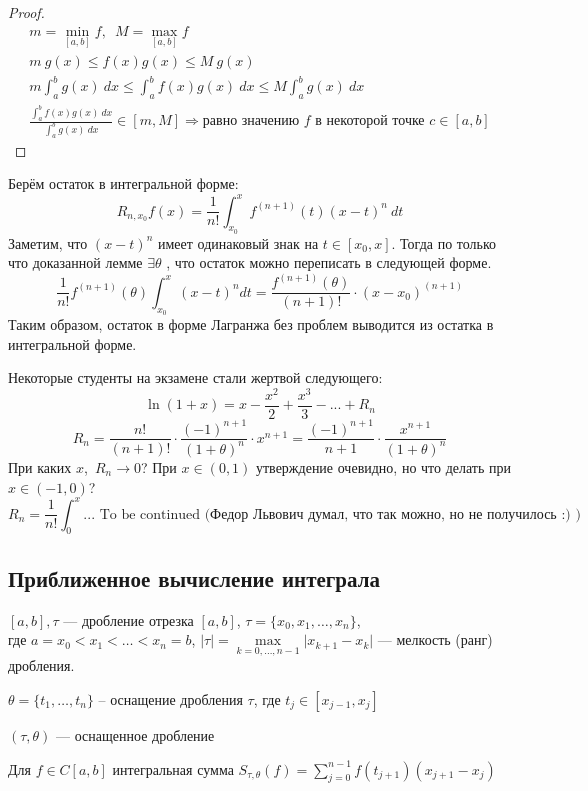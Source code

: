 \newpage 
\begin{proof}
    \[
        \begin{gathered}
            m = \min_{[a, b]} f, \,\,\, M = \max_{[a, b]} f\\
            m\ g(x) \leqslant f(x) g(x) \leqslant M\ g(x)\\
            m \int_a^b g(x)\ dx \leqslant \int_a^b f(x) g(x)\ dx \leqslant M \int_a^b g(x)\ dx\\
            \frac{\int_a^b f(x) g(x)\ dx}{\int_a^b g(x)\ dx} \in [m, M] \Rightarrow 
            \text{равно значению $f$ в некоторой точке $c\in [a,b]$}
        \end{gathered}
    \]
\end{proof}
\begin{follow}
        
    Берём остаток в интегральной форме:
    \[
        R_{n, x_0} f(x) = \frac{1}{n!} \int_{x_0}^x f^{(n + 1)}(t) (x - t) ^ n\ dt
    \]
    Заметим, что $(x - t)^n$ имеет одинаковый знак на $t\in [x_0, x]$. Тогда по только что доказанной лемме $\exists \theta$
    , что остаток можно переписать в следующей форме.
    \[
        \frac{1}{n!} f^{(n + 1)} (\theta) \int_{x_0}^x (x - t) ^ n dt = \frac{f^{(n + 1)}(\theta)}{(n + 1)!}  \cdot (x - x_0) ^ {(n + 1)}
    \]
    Таким образом, остаток в форме Лагранжа без проблем выводится из остатка в интегральной форме.
\end{follow}

\begin{remark}
    Некоторые студенты на экзамене стали жертвой следующего:
    \[
        \ln{(1+x)} = x - \frac{x ^ 2}{2} + \frac{x ^ 3}{3} - ... + R_n
    \]
    \[
        R_n = \frac{n!}{(n + 1)!} \cdot \frac{(-1) ^ {n + 1}}{(1 + \theta) ^ n} \cdot x^{n + 1} = \frac{(-1) ^ {n + 1}}{n + 1} \cdot \frac{x ^ {n + 1}}{(1 + \theta) ^ n}
    \]
    \quad 
    При каких $x$,\, $R_n \to 0$?
    При $x \in (0, 1)$ утверждение очевидно, но что делать при $x \in (-1, 0)$?
    \[
        R_n = \frac{1}{n!} \int_0^x ... \text{ To be continued (Федор Львович думал, что так можно, но не получилось :) )}
    \]
\end{remark}
\newpage 

\subsection{Приближенное вычисление интеграла}

\begin{definition}
    $[a, b], \tau $ --- дробление отрезка $[a, b]$, $\tau = \{ x_0, x_1, \ldots, x_n \}$, \\
    где $a = x_0 < x_1 < \ldots < x_n = b$, $|\tau|
    = \max\limits_{k = 0, \ldots, n - 1} \lvert x_{k + 1} - x_k \rvert$ --- мелкость (ранг) дробления.

    $\theta = \{ t_1, \ldots, t_n\}$ -- оснащение дробления $\tau$, где $t_j \in [x_{j - 1}, x_j]$

    $(\tau, \theta) $ --- оснащенное дробление

    Для $f \in C[a, b]$ интегральная сумма $S_{\tau, \theta} (f) = \sum\limits_{j = 0}^{n - 1} f(t_{j + 1}) (x_{j + 1} - x_j)$
\end{definition}

